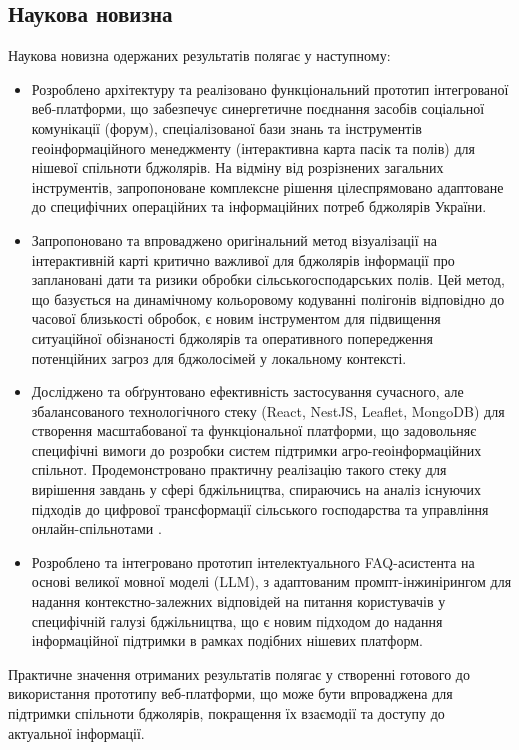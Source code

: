 \subsection*{Наукова новизна}
Наукова новизна одержаних результатів полягає у наступному:
\begin{itemize}
    \item Розроблено архітектуру та реалізовано функціональний прототип інтегрованої веб-платформи, що забезпечує синергетичне поєднання засобів соціальної комунікації (форум), спеціалізованої бази знань та інструментів геоінформаційного менеджменту (інтерактивна карта пасік та полів) для нішевої спільноти бджолярів. На відміну від розрізнених загальних інструментів, запропоноване комплексне рішення цілеспрямовано адаптоване до специфічних операційних та інформаційних потреб бджолярів України.
    \item Запропоновано та впроваджено оригінальний метод візуалізації на інтерактивній карті критично важливої для бджолярів інформації про заплановані дати та ризики обробки сільськогосподарських полів. Цей метод, що базується на динамічному кольоровому кодуванні полігонів відповідно до часової близькості обробок, є новим інструментом для підвищення ситуаційної обізнаності бджолярів та оперативного попередження потенційних загроз для бджолосімей у локальному контексті.
    \item Досліджено та обґрунтовано ефективність застосування сучасного, але збалансованого технологічного стеку (React, NestJS, Leaflet, MongoDB) для створення масштабованої та функціональної платформи, що задовольняє специфічні вимоги до розробки систем підтримки агро-геоінформаційних спільнот. Продемонстровано практичну реалізацію такого стеку для вирішення завдань у сфері бджільництва, спираючись на аналіз існуючих підходів до цифрової трансформації сільського господарства та управління онлайн-спільнотами \cite{preece2005onlinecommunities, huet2022digitalbeekeeping, guruprasad2024beeopen}.
    \item Розроблено та інтегровано прототип інтелектуального FAQ-асистента на основі великої мовної моделі (LLM), з адаптованим промпт-інжинірингом для надання контекстно-залежних відповідей на питання користувачів у специфічній галузі бджільництва, що є новим підходом до надання інформаційної підтримки в рамках подібних нішевих платформ.
\end{itemize}

Практичне значення отриманих результатів полягає у створенні готового до використання прототипу веб-платформи, що може бути впроваджена для підтримки спільноти бджолярів, покращення їх взаємодії та доступу до актуальної інформації.

